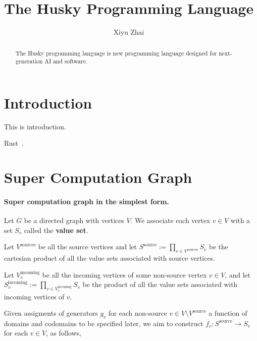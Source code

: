 \documentclass{article}
\title{The Husky Programming Language}
\date{}
\author{Xiyu Zhai}
\begin{document}

\maketitle

\begin{abstract}
	The Husky programming language is new programming language designed for next-generation AI and software.
\end{abstract}





\section{Introduction}
This is introduction.

Rust~\cite{bugden2022rust}.

\section{Super Computation Graph}

\paragraph{Super computation graph in the simplest form.} Let $G$ be a directed graph with vertices $V$. We associate each vertex $v\in V$ with a set $S_v$ called the \textbf{value set}.

Let $V^{\text{sources}}$ be all the source vertices and let $S^{\text{source}}:=\prod_{v\in V^{\text{sources}}}S_v$ be the cartesian product of all the value sets associated with source vertices.

Let $V^{\text{incoming}}_v$ be all the incoming vertices of some non-source vertex $v\in V$, and let $S^{\text{incoming}}_v:=\prod_{v\in V^{\text{incoming}}_v}S_v$ be the product of all the value sets associated with incoming vertices of $v$.

Given assigments of generators $g_v$ for each non-source $v\in V\setminus V^{\text{source}}$ a function of domains and codomains to be specified later, we aim to construct $f_v: S^{\text{source}} \rightarrow S_v$ for each $v\in V$, as follows,
\end{document}
